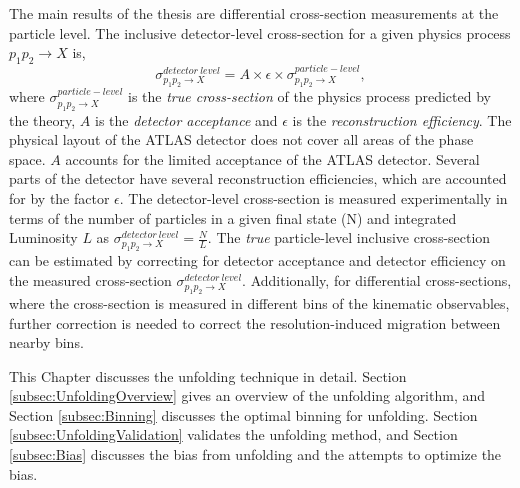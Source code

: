 The main results of the thesis are differential cross-section measurements at the particle level. The inclusive detector-level cross-section for a given physics process $p_{1}p_{2}\rightarrow X$ is, 
\begin{equation}
    \sigma ^{detector~level}_{p_{1}p_{2}\rightarrow X} = A \times \epsilon \times \sigma ^{particle-level}_{p_{1}p_{2}\rightarrow X},
    \label{eqn:InclusiveXS}
\end{equation}
where $\sigma ^{particle-level}_{p_{1}p_{2}\rightarrow X}$ is the \textit{true cross-section} of the physics process predicted by the theory, $A$ is the \textit{detector acceptance} and $\epsilon$ is the \textit{reconstruction efficiency}. The physical layout of the ATLAS detector does not cover all areas of the phase space. $A$ accounts for the limited acceptance of the ATLAS detector. Several parts of the detector have several reconstruction efficiencies, which are accounted for by the factor $\epsilon$. The detector-level cross-section is measured experimentally in terms of the number of particles in a given final state (N) and integrated Luminosity $L$ as $\sigma ^{detector~level}_{p_{1}p_{2}\rightarrow X} = \frac{N}{L}$. The \textit{true} particle-level inclusive cross-section can be estimated by correcting for detector acceptance and detector efficiency on the measured cross-section $\sigma ^{detector~level}_{p_{1}p_{2}\rightarrow X}$. Additionally, for differential cross-sections, where the cross-section is measured in different bins of the kinematic observables, further correction is needed to correct the resolution-induced migration between nearby bins. 

This Chapter discusses the unfolding technique in detail. Section \ref{subsec:UnfoldingOverview} gives an overview of the unfolding algorithm, and Section \ref{subsec:Binning} discusses the optimal binning for unfolding. Section \ref{subsec:UnfoldingValidation} validates the unfolding method, and Section \ref{subsec:Bias} discusses the bias from unfolding and the attempts to optimize the bias. 

